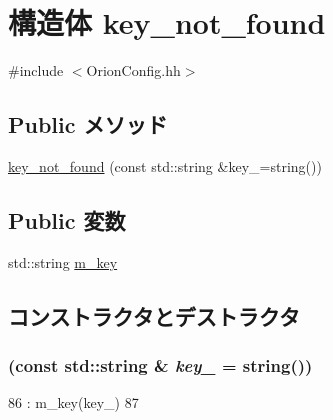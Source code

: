 \hypertarget{structOrionConfig_1_1key__not__found}{
\section{構造体 key\_\-not\_\-found}
\label{structOrionConfig_1_1key__not__found}
}


{\ttfamily \#include $<$OrionConfig.hh$>$}\subsection*{Public メソッド}
\begin{DoxyCompactItemize}
\item 
\hyperlink{structOrionConfig_1_1key__not__found_a1d70a0f0234cdb04da045d21091c24f3}{key\_\-not\_\-found} (const std::string \&key\_\-=string())
\end{DoxyCompactItemize}
\subsection*{Public 変数}
\begin{DoxyCompactItemize}
\item 
std::string \hyperlink{structOrionConfig_1_1key__not__found_acc7e2a331a9a946e407c9b63ee0c7275}{m\_\-key}
\end{DoxyCompactItemize}


\subsection{コンストラクタとデストラクタ}
\hypertarget{structOrionConfig_1_1key__not__found_a1d70a0f0234cdb04da045d21091c24f3}{
\subsubsection[{key\_\-not\_\-found}]{ (const std::string \& {\em key\_\-} = {\ttfamily string()})}}
\label{structOrionConfig_1_1key__not__found_a1d70a0f0234cdb04da045d21091c24f3}



\begin{DoxyCode}
86                                                       : m_key(key_)
87       {}
\end{DoxyCode}


